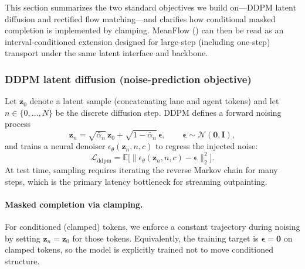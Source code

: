 \documentclass{article}
\theoremstyle{plain}
\theoremstyle{definition}
\theoremstyle{remark}
\begin{document}
This section summarizes the two standard objectives we build on---DDPM latent diffusion and rectified flow matching---and clarifies how conditional masked completion is implemented by clamping.
MeanFlow () can then be read as an interval-conditioned extension designed for large-step (including one-step) transport under the same latent interface and backbone.

\subsubsection{DDPM latent diffusion (noise-prediction objective)}
Let \(\mathbf{z}_0\) denote a latent sample (concatenating lane and agent tokens) and let \(n\in\{0,\dots,N\}\) be the discrete diffusion step.
DDPM defines a forward noising process
\begin{equation}
\label{eq:app:ddpm_forward}
\mathbf{z}_n = \sqrt{\bar{\alpha}_n}\,\mathbf{z}_0 + \sqrt{1-\bar{\alpha}_n}\,\boldsymbol{\epsilon},
\qquad
\boldsymbol{\epsilon}\sim\mathcal{N}(\mathbf{0},\mathbf{I}),
\end{equation}
and trains a neural denoiser \(\epsilon_{\theta}(\mathbf{z}_n,n,c)\) to regress the injected noise:
\begin{equation}
\label{eq:app:ddpm_loss}
\mathcal{L}_{\mathrm{ddpm}}
=
\mathbb{E}\Big[\big\lVert \epsilon_{\theta}(\mathbf{z}_n,n,c)-\boldsymbol{\epsilon}\big\rVert_2^2\Big].
\end{equation}
At test time, sampling requires iterating the reverse Markov chain for many steps, which is the primary latency bottleneck for streaming outpainting.

\paragraph{Masked completion via clamping.}
For conditioned (clamped) tokens, we enforce a constant trajectory during noising by setting \(\mathbf{z}_n=\mathbf{z}_0\) for those tokens.
Equivalently, the training target is \(\boldsymbol{\epsilon}=\mathbf{0}\) on clamped tokens, so the model is explicitly trained not to move conditioned structure.
\end{document}
